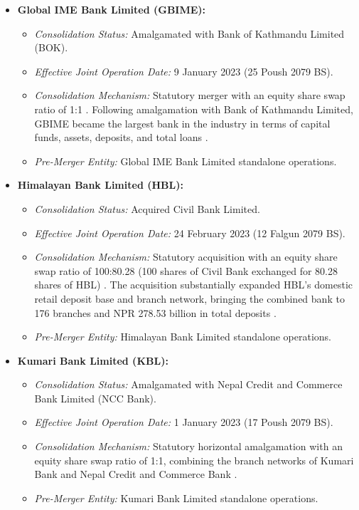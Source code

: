 \begin{itemize}
    \item \textbf{Global IME Bank Limited (GBIME):}
    \begin{itemize}
        \item \textit{Consolidation Status:} Amalgamated with Bank of Kathmandu Limited (BOK).
        \item \textit{Effective Joint Operation Date:} 9 January 2023 (25 Poush 2079 BS).
        \item \textit{Consolidation Mechanism:} Statutory merger with an equity share swap ratio of 1:1 \citep{gbime2023report}. Following amalgamation with Bank of Kathmandu Limited, GBIME became the largest bank in the industry in terms of capital funds, assets, deposits, and total loans \citep{gbime2023report}.
        \item \textit{Pre-Merger Entity:} Global IME Bank Limited standalone operations.
    \end{itemize}

    \item \textbf{Himalayan Bank Limited (HBL):}
    \begin{itemize}
        \item \textit{Consolidation Status:} Acquired Civil Bank Limited.
        \item \textit{Effective Joint Operation Date:} 24 February 2023 (12 Falgun 2079 BS).
        \item \textit{Consolidation Mechanism:} Statutory acquisition with an equity share swap ratio of 100:80.28 (100 shares of Civil Bank exchanged for 80.28 shares of HBL) \citep{hbl2023report}. The acquisition substantially expanded HBL's domestic retail deposit base and branch network, bringing the combined bank to 176 branches and NPR 278.53 billion in total deposits \citep{hbl2023report}.
        \item \textit{Pre-Merger Entity:} Himalayan Bank Limited standalone operations.
    \end{itemize}

    \item \textbf{Kumari Bank Limited (KBL):}
    \begin{itemize}
        \item \textit{Consolidation Status:} Amalgamated with Nepal Credit and Commerce Bank Limited (NCC Bank).
        \item \textit{Effective Joint Operation Date:} 1 January 2023 (17 Poush 2079 BS).
        \item \textit{Consolidation Mechanism:} Statutory horizontal amalgamation with an equity share swap ratio of 1:1, combining the branch networks of Kumari Bank and Nepal Credit and Commerce Bank \citep{kumari2022sgm}.
        \item \textit{Pre-Merger Entity:} Kumari Bank Limited standalone operations.
    \end{itemize}


\end{itemize}

